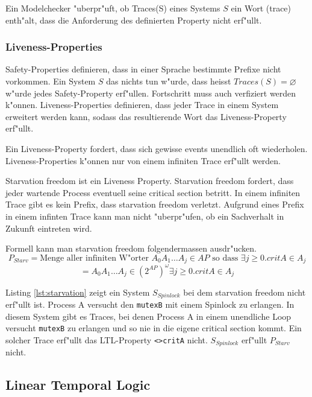 \documentclass[a4paper, twoside]{article}
\begin{document}
Ein Modelchecker "uberpr"uft, ob Traces(S) eines Systems $S$ ein Wort (trace) enth"alt, dass die Anforderung des definierten Property nicht erf"ullt.

\subsubsection{Liveness-Properties}
\label{sec:liveness}

Safety-Properties definieren, dass in einer Sprache bestimmte Prefixe nicht vorkommen. Ein System $S$ das nichts tun w"urde, dass heisst $Traces(S)=\varnothing$ w"urde jedes Safety-Property erf"ullen. Fortschritt muss auch verfiziert werden k"onnen. Liveness-Properties definieren, dass jeder Trace in einem System erweitert werden kann, sodass das resultierende Wort das Liveness-Property erf"ullt.

Ein Liveness-Property fordert, dass sich gewisse events unendlich oft wiederholen. Liveness-Properties k"onnen nur von einem infiniten Trace erf"ullt werden. 

Starvation freedom ist ein Liveness Property. Starvation freedom fordert, dass jeder wartende Process eventuell seine critical section betritt. In einem infiniten Trace gibt es kein Prefix, dass starvation freedom verletzt. Aufgrund eines Prefix in einem infinten Trace kann man nicht "uberpr"ufen, ob ein Sachverhalt in Zukunft eintreten wird.

Formell kann man starvation freedom folgendermassen ausdr"ucken.
\[
P_{Starv} = \text{Menge aller infiniten W"orter } A_0 A_1 \dots A_j \in AP \text{ so dass }\exists j \geq 0. critA \in A_j
\]
\[
 = { A_0 A_1 \dots A_j \in (2^{AP})^{\omega} \exists j \geq 0. critA \in A_j}
\]

Listing \ref{lst:starvation} zeigt ein System $S_{Spinlock}$ bei dem starvation freedom nicht erf"ullt ist. Process A versucht den \verb|mutexB| mit einem Spinlock zu erlangen. In diesem System gibt es Traces, bei denen Process A in einem unendliche Loop versucht \verb|mutexB| zu erlangen und so nie in die eigene critical section kommt. Ein solcher Trace erf"ullt das LTL-Property \verb|<>critA| nicht. $S_{Spinlock}$ erf"ullt $P_{Starv}$ nicht.



\subsection{Linear Temporal Logic}
\label{sec:lineartemporallogic}
\end{document}
